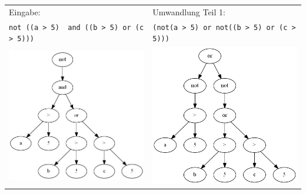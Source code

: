 \begin{tabular}{ll}
Eingabe: & Umwandlung Teil 1:\\
\verb|not ((a > 5)  and ((b > 5) or (c > 5)))| & \verb|(not(a > 5) or not((b > 5) or (c > 5)))|\\
\includegraphics[scale=0.45]{Bilder/not_graph1.png} & \includegraphics[scale=0.45]{Bilder/not_graph2.png}\\
\end{tabular}

